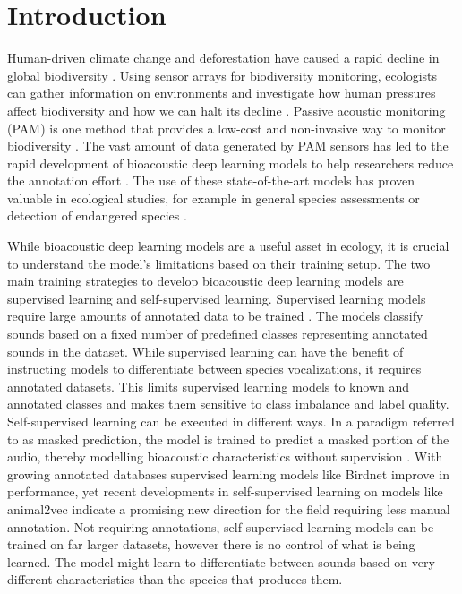\section{Introduction}
\label{sec:introcution}

Human-driven climate change and deforestation have caused a rapid decline in global biodiversity \cite{gosselin_relationships_2018}.
Using sensor arrays for biodiversity monitoring, ecologists can gather information on environments and investigate how human pressures affect biodiversity and how we can halt its decline \cite{schmeller_building_2017}.
Passive acoustic monitoring (PAM) is one method that provides a low-cost and non-invasive way to monitor biodiversity \cite{sugai_terrestrial_2019}.
The vast amount of data generated by PAM sensors has led to the rapid development of bioacoustic deep learning models to help researchers reduce the annotation effort \cite{stowell_computational_2022}.
The use of these state-of-the-art models has proven valuable in ecological studies, for example in general species assessments \cite{tuia_perspectives_2022,cowans_improving_2024} or detection of endangered species \cite{allen-ankins_use_2025}.

While bioacoustic deep learning models are a useful asset in ecology, it is crucial to understand the model's limitations based on their training setup.
The two main training strategies to develop bioacoustic deep learning models are supervised learning and self-supervised learning.
Supervised learning models require large amounts of annotated data to be trained \cite{hagiwara_aves_2022}.
The models classify sounds based on a fixed number of predefined classes representing annotated sounds in the dataset.
While supervised learning can have the benefit of instructing models to differentiate between species vocalizations, it requires annotated datasets.
This limits supervised learning models to known and annotated classes and makes them sensitive to class imbalance and label quality.
Self-supervised learning can be executed in different ways.
In a paradigm referred to as masked prediction, the model is trained to predict a masked portion of the audio, thereby modelling bioacoustic characteristics without supervision \cite{baevski_efficient_2023,huang_masked_2022}.
With growing annotated databases supervised learning models like Birdnet \cite{kahl_birdnet_2021} improve in performance, yet recent developments in self-supervised learning on models like animal2vec \cite{schafer-zimmermann_animal2vec_2024} indicate a promising new direction for the field requiring less manual annotation.
Not requiring annotations, self-supervised learning models can be trained on far larger datasets, however there is no control of what is being learned.
The model might learn to differentiate between sounds based on very different characteristics than the species that produces them.

